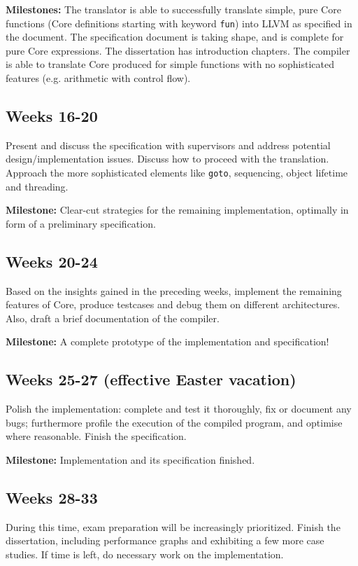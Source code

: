 \documentclass[12pt]{article}
\begin{document}
\textbf{Milestones:} The translator is able to successfully translate simple, pure Core functions (Core definitions starting with keyword \texttt{fun}) into LLVM as specified in the document. The specification document is taking shape, and is complete for pure Core expressions. The dissertation has introduction chapters. The compiler is able to translate Core produced for simple functions with no sophisticated features (e.g. arithmetic with control flow).

\subsection{Weeks 16-20}
Present and discuss the specification with supervisors and address potential design/implementation issues. Discuss how to proceed with the translation. Approach the more sophisticated elements like \texttt{goto}, sequencing, object lifetime and threading.

\textbf{Milestone:} Clear-cut strategies for the remaining implementation, optimally in form of a preliminary specification. 

\subsection{Weeks 20-24}
Based on the insights gained in the preceding weeks, implement the remaining features of Core, produce testcases and debug them on different architectures. Also, draft a brief documentation of the compiler. 

\textbf{Milestone:} A complete prototype of the implementation and specification!


\subsection{Weeks 25-27 (effective Easter vacation)}
Polish the implementation: complete and test it thoroughly, fix or document any bugs; furthermore profile the execution of the compiled program, and optimise where reasonable. Finish the specification. 

\textbf{Milestone:} Implementation and its specification finished.

\subsection{Weeks 28-33}
During this time, exam preparation will be increasingly prioritized. Finish the dissertation, including performance graphs and exhibiting a few more case studies. If time is left, do necessary work on the implementation. 
\end{document}
